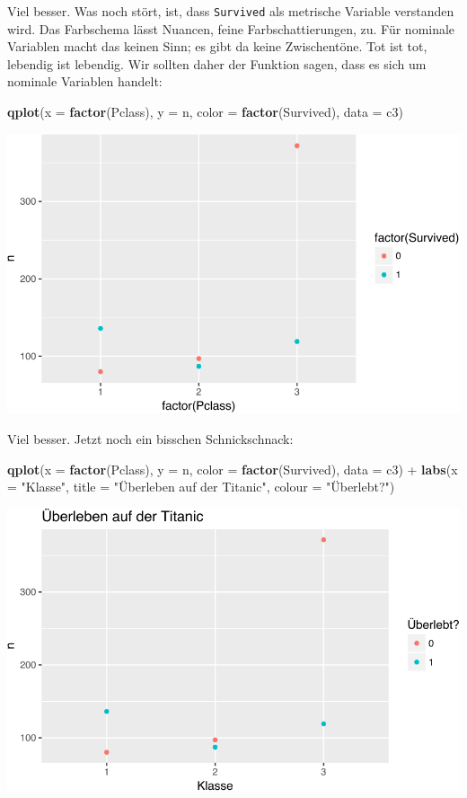 \documentclass[12pt,ngerman,]{book}
\newenvironment{Shaded}{\begin{snugshade}}{\end{snugshade}}
\newcommand{\KeywordTok}[1]{\textcolor[rgb]{0.13,0.29,0.53}{\textbf{{#1}}}}
\newcommand{\DataTypeTok}[1]{\textcolor[rgb]{0.13,0.29,0.53}{{#1}}}
\newcommand{\StringTok}[1]{\textcolor[rgb]{0.31,0.60,0.02}{{#1}}}
\newcommand{\NormalTok}[1]{{#1}}
\renewenvironment{Shaded}{\begin{kframe}}{\end{kframe}}
\begin{document}
Viel besser. Was noch stört, ist, dass \texttt{Survived} als metrische
Variable verstanden wird. Das Farbschema lässt Nuancen, feine
Farbschattierungen, zu. Für nominale Variablen macht das keinen Sinn; es
gibt da keine Zwischentöne. Tot ist tot, lebendig ist lebendig. Wir
sollten daher der Funktion sagen, dass es sich um nominale Variablen
handelt:

\begin{Shaded}
\begin{Highlighting}[]
\KeywordTok{qplot}\NormalTok{(}\DataTypeTok{x =} \KeywordTok{factor}\NormalTok{(Pclass), }\DataTypeTok{y =} \NormalTok{n, }\DataTypeTok{color =} \KeywordTok{factor}\NormalTok{(Survived), }\DataTypeTok{data =} \NormalTok{c3)}
\end{Highlighting}
\end{Shaded}

\begin{center}\includegraphics[width=0.7\linewidth]{075_Fallstudie_Titanic_files/figure-latex/unnamed-chunk-7-1} \end{center}

Viel besser. Jetzt noch ein bisschen Schnickschnack:

\begin{Shaded}
\begin{Highlighting}[]
\KeywordTok{qplot}\NormalTok{(}\DataTypeTok{x =} \KeywordTok{factor}\NormalTok{(Pclass), }\DataTypeTok{y =} \NormalTok{n, }\DataTypeTok{color =} \KeywordTok{factor}\NormalTok{(Survived), }\DataTypeTok{data =} \NormalTok{c3) +}\StringTok{ }
\StringTok{  }\KeywordTok{labs}\NormalTok{(}\DataTypeTok{x =} \StringTok{"Klasse"}\NormalTok{, }
       \DataTypeTok{title =} \StringTok{"Überleben auf der Titanic"}\NormalTok{,}
       \DataTypeTok{colour =} \StringTok{"Überlebt?"}\NormalTok{)}
\end{Highlighting}
\end{Shaded}

\begin{center}\includegraphics[width=0.7\linewidth]{075_Fallstudie_Titanic_files/figure-latex/unnamed-chunk-8-1} \end{center}
\end{document}
